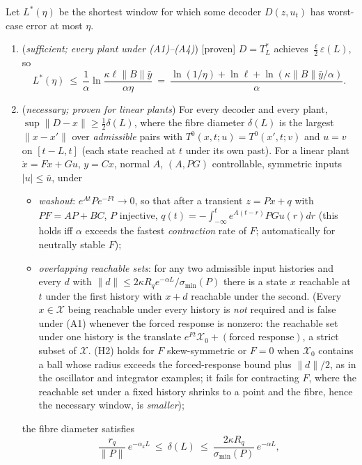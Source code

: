 \begin{theorem}\label{thm:m2-window}
Let $L^*(\eta)$ be the shortest window for which some decoder $D(z,u_t)$ has worst-case error at most $\eta$.
\begin{enumerate}
\item[(a)] (\emph{sufficient; every plant under (A1)--(A4)}) [proven] $D=T_L^*$ achieves
$\tfrac{\ell}{2}\varepsilon(L)$, so
\[
L^*(\eta)\ \le\ \frac1\alpha\ln\frac{\kappa\ell\|B\|\bar y}{\alpha\eta}\ =\ \frac{\ln(1/\eta)+\ln\ell+\ln(\kappa\|B\|\bar y/\alpha)}{\alpha}.
\]
\item[(b)] (\emph{necessary; proven for linear plants}) For every decoder and every plant,
$\sup\|D-x\|\ge\frac12\delta(L)$, where the fibre diameter $\delta(L)$ is the largest $\|x-x'\|$ over
\emph{admissible} pairs with $T^0(x,t;u)=T^0(x',t;v)$ and $u=v$ on $[t-L,t]$ (each state reached at $t$ under its own
past). For a linear plant $\dot x=Fx+Gu$, $y=Cx$, normal $A$, $(A,PG)$ controllable, symmetric inputs $|u|\le\bar u$, under
\begin{itemize}
\item[(H1)] \emph{washout}: $e^{At}Pe^{-Ft}\to0$, so that after a transient $z=Px+q$ with $PF=AP+BC$, $P$
injective, $q(t)=-\int_{-\infty}^te^{A(t-r)}PGu(r)dr$ (this holds iff $\alpha$ exceeds the fastest
\emph{contraction} rate of $F$; automatically for neutrally stable $F$);
\item[(H2)] \emph{overlapping reachable sets}: for any two admissible input histories and every $d$ with
$\|d\|\le2\kappa R_qe^{-\alpha L}/\sigma_{\min}(P)$ there is a state $x$ reachable at $t$ under the first history with
$x+d$ reachable under the second. (Every $x\in\mathcal X$ being reachable under every history is \emph{not} required and
is false under (A1) whenever the forced response is nonzero: the reachable set under one history is the translate
$e^{Ft}\mathcal X_0+(\text{forced response})$, a strict subset of $\mathcal X$. (H2) holds for $F$ skew-symmetric or
$F=0$ when $\mathcal X_0$ contains a ball whose radius exceeds the forced-response bound plus $\|d\|/2$, as in the
oscillator and integrator examples; it fails for contracting $F$, where the reachable set under a fixed history shrinks
to a point and the fibre, hence the necessary window, is \emph{smaller});
\end{itemize}
the fibre diameter satisfies
\[
 \frac{r_q}{\|P\|}\,e^{-\alpha_k L}\ \le\ \delta(L)\ \le\ \frac{2\kappa R_q}{\sigma_{\min}(P)}\,e^{-\alpha L},
\]
\end{enumerate}
\end{theorem}
